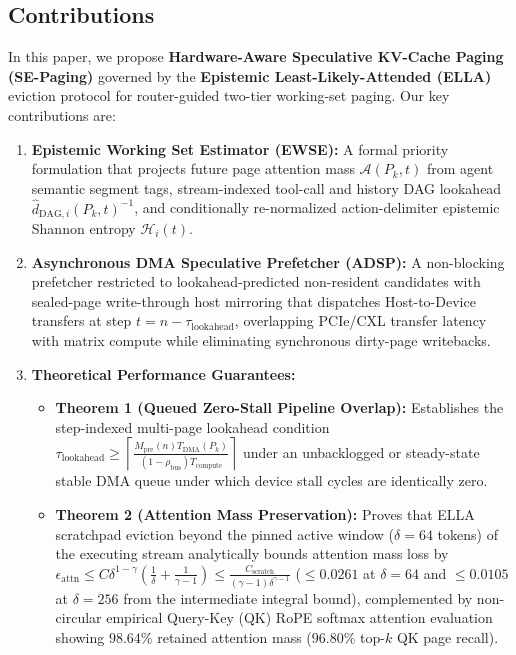 \documentclass[conference,10pt]{IEEEtran}
\begin{document}
\subsection{Contributions}
In this paper, we propose \textbf{Hardware-Aware Speculative KV-Cache Paging (SE-Paging)} governed by the \textbf{Epistemic Least-Likely-Attended (ELLA)} eviction protocol for router-guided two-tier working-set paging. Our key contributions are:
\begin{enumerate}
    \item \textbf{Epistemic Working Set Estimator (EWSE):} A formal priority formulation that projects future page attention mass $\mathcal{A}(P_k, t)$ from agent semantic segment tags, stream-indexed tool-call and history DAG lookahead $\hat{d}_{\text{DAG},i}(P_k, t)^{-1}$, and conditionally re-normalized action-delimiter epistemic Shannon entropy $\mathcal{H}_i(t)$.
    \item \textbf{Asynchronous DMA Speculative Prefetcher (ADSP):} A non-blocking prefetcher restricted to lookahead-predicted non-resident candidates with sealed-page write-through host mirroring that dispatches Host-to-Device transfers at step $t = n - \tau_{\text{lookahead}}$, overlapping PCIe/CXL transfer latency with matrix compute while eliminating synchronous dirty-page writebacks.
    \item \textbf{Theoretical Performance Guarantees:}
    \begin{itemize}
        \item \textbf{Theorem 1 (Queued Zero-Stall Pipeline Overlap):} Establishes the step-indexed multi-page lookahead condition $\tau_{\text{lookahead}} \ge \left\lceil \frac{M_{\text{pre}}(n) T_{\text{DMA}}(P_k)}{(1-\rho_{\text{bus}})T_{\text{compute}}} \right\rceil$ under an unbacklogged or steady-state stable DMA queue under which device stall cycles are identically zero.
        \item \textbf{Theorem 2 (Attention Mass Preservation):} Proves that ELLA scratchpad eviction beyond the pinned active window ($\delta = 64$ tokens) of the executing stream analytically bounds attention mass loss by $\epsilon_{\text{attn}} \le C\delta^{1-\gamma}\!\left(\frac{1}{\delta} + \frac{1}{\gamma-1}\right) \le \frac{C_{\text{scratch}}}{(\gamma - 1)\delta^{\gamma - 1}}$ ($\le 0.0261$ at $\delta=64$ and $\le 0.0105$ at $\delta=256$ from the intermediate integral bound), complemented by non-circular empirical Query-Key (QK) RoPE softmax attention evaluation showing $98.64\%$ retained attention mass ($96.80\%$ top-$k$ QK page recall).

\end{itemize}
\end{enumerate}
\end{document}
